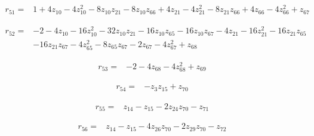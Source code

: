 \par\noindent\begin{minipage}{\linewidth}
\begin{align*}
r_{51}={}&1+4z_{10}-4z_{10}^{2}-8z_{10}z_{21}-8z_{10}z_{66}+4z_{21}-4z_{21}^{2}-8z_{21}z_{66}+4z_{66}-4z_{66}^{2}+z_{67}
\end{align*}
\end{minipage}\par
\par\noindent\begin{minipage}{\linewidth}
\begin{align*}
r_{52}={}&-2-4z_{10}-16z_{10}^{2}-32z_{10}z_{21}-16z_{10}z_{65}-16z_{10}z_{67}-4z_{21}-16z_{21}^{2}-16z_{21}z_{65}\\[-2pt]
&-16z_{21}z_{67}-4z_{65}^{2}-8z_{65}z_{67}-2z_{67}-4z_{67}^{2}+z_{68}
\end{align*}
\end{minipage}\par
\par\noindent\begin{minipage}{\linewidth}
\begin{align*}
r_{53}={}&-2-4z_{68}-4z_{68}^{2}+z_{69}
\end{align*}
\end{minipage}\par
\par\noindent\begin{minipage}{\linewidth}
\begin{align*}
r_{54}={}&-z_{3}z_{15}+z_{70}
\end{align*}
\end{minipage}\par
\par\noindent\begin{minipage}{\linewidth}
\begin{align*}
r_{55}={}&z_{14}-z_{15}-2z_{24}z_{70}-z_{71}
\end{align*}
\end{minipage}\par
\par\noindent\begin{minipage}{\linewidth}
\begin{align*}
r_{56}={}&z_{14}-z_{15}-4z_{26}z_{70}-2z_{29}z_{70}-z_{72}
\end{align*}
\end{minipage}\par
